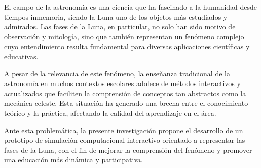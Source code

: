 El campo de la astronomía es una ciencia que ha fascinado a la humanidad desde tiempos inmemoria, 
siendo la Luna uno de los objetos más estudiados y admirados. Las fases de la Luna, en particular,
no solo han sido motivo de observación y mitología, sino que también representan un fenómeno complejo
cuyo entendimiento resulta fundamental para diversas aplicaciones científicas y educativas.

A pesar de la relevancia de este fenómeno, la enseñanza tradicional de la astronomía en muchos contextos escolares
adolece de métodos interactivos y actualizados que faciliten la comprensión de conceptos tan abstractos como la mecánica celeste. 
Esta situación ha generado una brecha entre el conocimiento teórico y la práctica, afectando la calidad del aprendizaje en el área.

Ante esta problemática, la presente investigación propone el desarrollo de un prototipo de simulación computacional interactivo orientado 
a representar las fases de la Luna, con el fin de mejorar la comprensión del fenómeno y promover una educación más dinámica y participativa.
